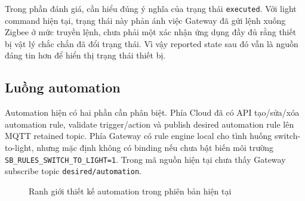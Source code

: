Trong phần đánh giá, cần hiểu đúng ý nghĩa của trạng thái \texttt{executed}. Với light command hiện tại, trạng thái này phản ánh việc Gateway đã gửi lệnh xuống Zigbee ở mức truyền lệnh, chưa phải một xác nhận ứng dụng đầy đủ rằng thiết bị vật lý chắc chắn đã đổi trạng thái. Vì vậy reported state sau đó vẫn là nguồn đáng tin hơn để hiển thị trạng thái thiết bị.

\subsection{Luồng automation}
\label{sec:ch3-automation-flow}

Automation hiện có hai phần cần phân biệt. Phía Cloud đã có API tạo/sửa/xóa automation rule, validate trigger/action và publish desired automation rule lên MQTT retained topic. Phía Gateway có rule engine local cho tình huống switch-to-light, nhưng mặc định không có binding nếu chưa bật biến môi trường \texttt{SB\_RULES\_SWITCH\_TO\_LIGHT=1}. Trong mã nguồn hiện tại chưa thấy Gateway subscribe topic \texttt{desired/automation}.

\begin{figure}[H]
    \centering
    \caption{Ranh giới thiết kế automation trong phiên bản hiện tại}
    \label{fig:ch3-automation-boundary}
\end{figure}

